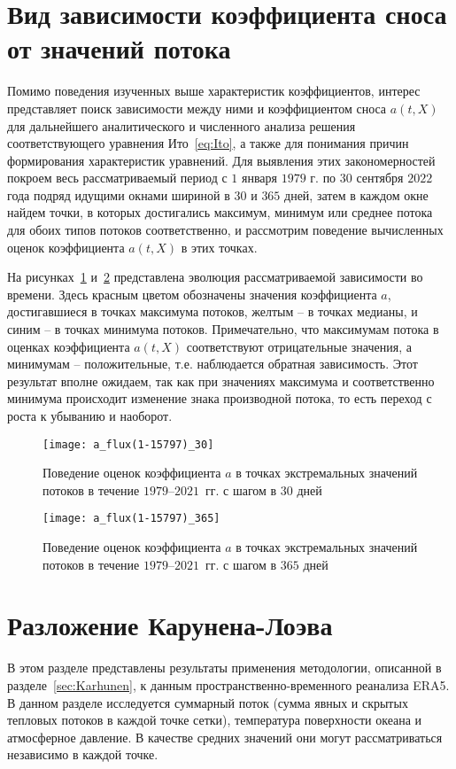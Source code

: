 \section{Вид зависимости коэффициента сноса от значений потока}
Помимо поведения изученных выше характеристик коэффициентов, интерес представляет поиск зависимости между ними и коэффициентом сноса $a(t,X)$ для дальнейшего аналитического и численного анализа решения соответствующего уравнения Ито~\eqref{eq:Ito}, а также для понимания причин формирования характеристик уравнений. Для выявления этих закономерностей покроем весь рассматриваемый период с $1$ января $1979$ г. по $30$ сентября $2022$ года подряд идущими окнами шириной в $30$ и $365$ дней, затем в каждом окне найдем точки, в которых достигались максимум, минимум или среднее потока для обоих типов потоков соответственно, и рассмотрим поведение вычисленных оценок коэффициента $a(t,X)$ в этих точках.

На рисунках~\ref{fig:a_flux_month} и~\ref{fig:a_flux_year} представлена эволюция рассматриваемой зависимости во времени. Здесь красным цветом обозначены значения коэффициента $a$, достигавшиеся в точках максимума потоков, желтым -- в точках медианы, и синим -- в точках минимума потоков. Примечательно, что максимумам потока в оценках коэффициента $a(t,X)$ соответствуют отрицательные значения, а минимумам -- положительные, т.е. наблюдается обратная зависимость. Этот результат вполне ожидаем, так как при значениях максимума и соответственно минимума происходит изменение знака производной потока, то есть переход с роста к убыванию и наоборот.

\begin{figure}[!h]
	\centering
	\texttt{[image: a\_flux(1-15797)\_30]}
	\caption{Поведение оценок коэффициента $a$ в точках экстремальных значений потоков в течение $1979$--$2021$~гг. с шагом в $30$ дней}
	\label{fig:a_flux_month}
\end{figure}

\begin{figure}[!h]
	\centering
	\texttt{[image: a\_flux(1-15797)\_365]}
	\caption{Поведение оценок коэффициента $a$ в точках экстремальных значений потоков в течение $1979$--$2021$~гг. с шагом в $365$ дней}\label{fig:a_flux_year}
\end{figure}

\section{Разложение Карунена-Лоэва}
\label{sec:analysis}
В этом разделе представлены результаты применения методологии, описанной в разделе~\ref{sec:Karhunen}, к данным пространственно-временного реанализа ERA5. В данном разделе исследуется суммарный поток (сумма явных и скрытых тепловых потоков в каждой точке сетки), температура поверхности океана и атмосферное давление. В качестве средних значений они могут рассматриваться независимо в каждой точке.

